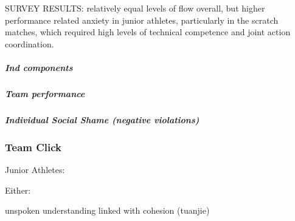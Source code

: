 \begin{CJK}{UTF8}{gbsn}

  SURVEY RESULTS: relatively equal levels of flow overall, but higher performance related anxiety in junior athletes, particularly in the scratch matches, which required high levels of technical competence and joint action coordination.











          \subparagraph{Ind components}
          \subparagraph{Team performance}

          \subparagraph{Individual Social Shame (negative violations)}


















        \subsubsection{Team Click}


  Junior Athletes:

  Either:

  unspoken understanding linked with cohesion (tuanjie)


\end{CJK}
